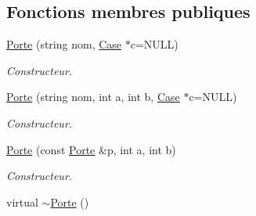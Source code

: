 \subsection*{\-Fonctions membres publiques}
\begin{DoxyCompactItemize}
\item 
\hypertarget{classPorte_a49db32e64af8caf782fe54bffa572d7b}{\hyperlink{classPorte_a49db32e64af8caf782fe54bffa572d7b}{\-Porte} (string nom, \hyperlink{classCase}{\-Case} $\ast$c=\-N\-U\-L\-L)}\label{classPorte_a49db32e64af8caf782fe54bffa572d7b}

\begin{DoxyCompactList}\small\item\em \-Constructeur. \end{DoxyCompactList}\item 
\hypertarget{classPorte_a827b8c0f75a4e19c5763523462c6f224}{\hyperlink{classPorte_a827b8c0f75a4e19c5763523462c6f224}{\-Porte} (string nom, int a, int b, \hyperlink{classCase}{\-Case} $\ast$c=\-N\-U\-L\-L)}\label{classPorte_a827b8c0f75a4e19c5763523462c6f224}

\begin{DoxyCompactList}\small\item\em \-Constructeur. \end{DoxyCompactList}\item 
\hypertarget{classPorte_aa3fdf234c17c43b98bdec5f9d69778a6}{\hyperlink{classPorte_aa3fdf234c17c43b98bdec5f9d69778a6}{\-Porte} (const \hyperlink{classPorte}{\-Porte} \&p, int a, int b)}\label{classPorte_aa3fdf234c17c43b98bdec5f9d69778a6}

\begin{DoxyCompactList}\small\item\em \-Constructeur. \end{DoxyCompactList}\item 
\hypertarget{classPorte_a7b82ccac24bfd8b7fa701f7601328d6c}{virtual \hyperlink{classPorte_a7b82ccac24bfd8b7fa701f7601328d6c}{$\sim$\-Porte} ()}\label{classPorte_a7b82ccac24bfd8b7fa701f7601328d6c}


\end{DoxyCompactItemize}
